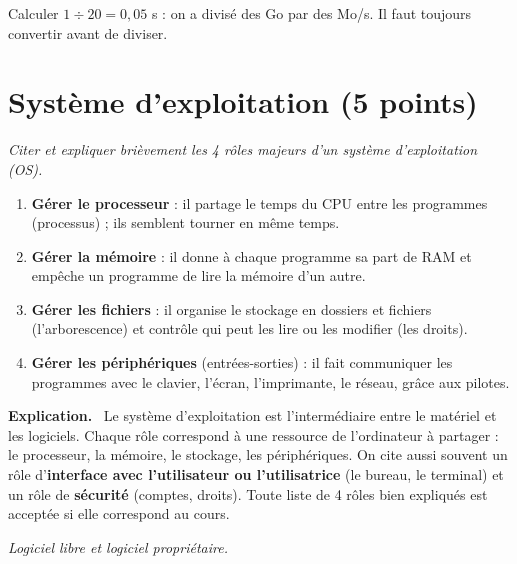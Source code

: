 \documentclass[addpoints, 11pt]{exam}
\newcommand{\enonce}[1]{\textit{#1}\par\smallskip}
\newcommand{\explication}{\par\smallskip\noindent\textbf{Explication.}\ }
\DeclareRobustCommand{\_}{\textunderscore\allowbreak}
\begin{document}
\begin{questions}
\begin{parts}
\begin{erreur}
Calculer $1 \div 20 = 0{,}05$ s : on a divisé des Go par des Mo/s. Il faut toujours convertir avant de diviser.
\end{erreur}
\end{parts}

\section{Système d'exploitation (5 points)}

\question[2] \enonce{Citer et expliquer brièvement les 4 rôles majeurs d'un système d'exploitation (OS).}

\begin{reponse}
\begin{enumerate}
  \item \textbf{Gérer le processeur} : il partage le temps du CPU entre les programmes (processus) ; ils semblent tourner en même temps.
  \item \textbf{Gérer la mémoire} : il donne à chaque programme sa part de RAM et empêche un programme de lire la mémoire d'un autre.
  \item \textbf{Gérer les fichiers} : il organise le stockage en dossiers et fichiers (l'arborescence) et contrôle qui peut les lire ou les modifier (les droits).
  \item \textbf{Gérer les périphériques} (entrées-sorties) : il fait communiquer les programmes avec le clavier, l'écran, l'imprimante, le réseau, grâce aux pilotes.
\end{enumerate}
\end{reponse}

\explication
Le système d'exploitation est l'intermédiaire entre le matériel et les logiciels. Chaque rôle correspond à une ressource de l'ordinateur à partager : le processeur, la mémoire, le stockage, les périphériques.
On cite aussi souvent un rôle d'\textbf{interface avec l'utilisateur ou l'utilisatrice} (le bureau, le terminal) et un rôle de \textbf{sécurité} (comptes, droits). Toute liste de 4 rôles bien expliqués est acceptée si elle correspond au cours.

\question[3] \enonce{Logiciel libre et logiciel propriétaire.}
\end{questions}
\end{document}
